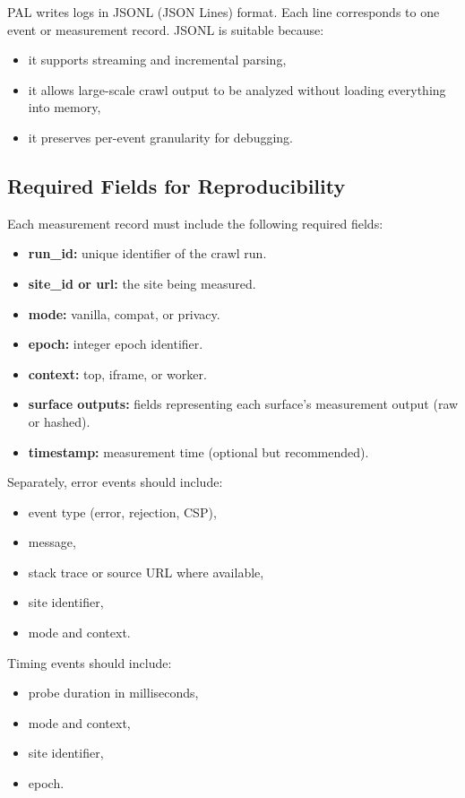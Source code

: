 \documentclass[11pt]{report}
\begin{document}
PAL writes logs in JSONL (JSON Lines) format. Each line corresponds to one event or measurement record. JSONL is suitable because:

\begin{itemize}
    \item it supports streaming and incremental parsing,
    \item it allows large-scale crawl output to be analyzed without loading everything into memory,
    \item it preserves per-event granularity for debugging.
\end{itemize}

\subsection{Required Fields for Reproducibility}

Each measurement record must include the following required fields:

\begin{itemize}
    \item \textbf{run\_id:} unique identifier of the crawl run.
    \item \textbf{site\_id or url:} the site being measured.
    \item \textbf{mode:} vanilla, compat, or privacy.
    \item \textbf{epoch:} integer epoch identifier.
    \item \textbf{context:} top, iframe, or worker.
    \item \textbf{surface outputs:} fields representing each surface’s measurement output (raw or hashed).
    \item \textbf{timestamp:} measurement time (optional but recommended).
\end{itemize}

Separately, error events should include:
\begin{itemize}
    \item event type (error, rejection, CSP),
    \item message,
    \item stack trace or source URL where available,
    \item site identifier,
    \item mode and context.
\end{itemize}

Timing events should include:
\begin{itemize}
    \item probe duration in milliseconds,
    \item mode and context,
    \item site identifier,
    \item epoch.
\end{itemize}
\end{document}
